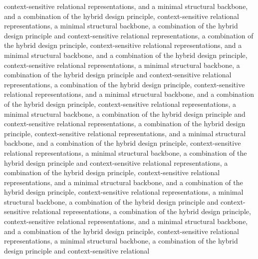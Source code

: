 context-sensitive relational representations, and a minimal structural backbone, and a combination of the hybrid design principle, context-sensitive relational representations, a minimal structural backbone, a combination of the hybrid design principle and context-sensitive relational representations, a combination of the hybrid design principle, context-sensitive relational representations, and a minimal structural backbone, and a combination of the hybrid design principle, context-sensitive relational representations, a minimal structural backbone, a combination of the hybrid design principle and context-sensitive relational representations, a combination of the hybrid design principle, context-sensitive relational representations, and a minimal structural backbone, and a combination of the hybrid design principle, context-sensitive relational representations, a minimal structural backbone, a combination of the hybrid design principle and context-sensitive relational representations, a combination of the hybrid design principle, context-sensitive relational representations, and a minimal structural backbone, and a combination of the hybrid design principle, context-sensitive relational representations, a minimal structural backbone, a combination of the hybrid design principle and context-sensitive relational representations, a combination of the hybrid design principle, context-sensitive relational representations, and a minimal structural backbone, and a combination of the hybrid design principle, context-sensitive relational representations, a minimal structural backbone, a combination of the hybrid design principle and context-sensitive relational representations, a combination of the hybrid design principle, context-sensitive relational representations, and a minimal structural backbone, and a combination of the hybrid design principle, context-sensitive relational representations, a minimal structural backbone, a combination of the hybrid design principle and context-sensitive relational